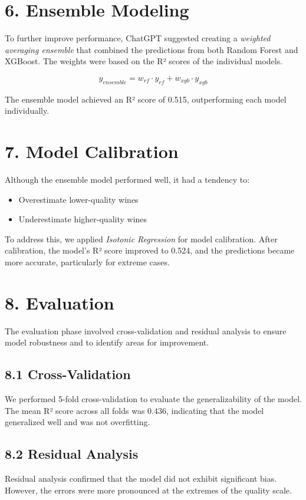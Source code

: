 \documentclass{article}
\begin{document}
\section{6. Ensemble Modeling}
To further improve performance, ChatGPT suggested creating a \textit{weighted averaging ensemble} that combined the predictions from both Random Forest and XGBoost. The weights were based on the R² scores of the individual models.

\begin{equation}
y_{ensemble} = w_{rf} \cdot y_{rf} + w_{xgb} \cdot y_{xgb}
\end{equation}

The ensemble model achieved an R² score of 0.515, outperforming each model individually.

\section{7. Model Calibration}
Although the ensemble model performed well, it had a tendency to:
\begin{itemize}
    \item Overestimate lower-quality wines
    \item Underestimate higher-quality wines
\end{itemize}

To address this, we applied \textit{Isotonic Regression} for model calibration. After calibration, the model’s R² score improved to 0.524, and the predictions became more accurate, particularly for extreme cases.

\section{8. Evaluation}
The evaluation phase involved cross-validation and residual analysis to ensure model robustness and to identify areas for improvement.

\subsection{8.1 Cross-Validation}
We performed 5-fold cross-validation to evaluate the generalizability of the model. The mean R² score across all folds was 0.436, indicating that the model generalized well and was not overfitting.

\subsection{8.2 Residual Analysis}
Residual analysis confirmed that the model did not exhibit significant bias. However, the errors were more pronounced at the extremes of the quality scale.
\end{document}
